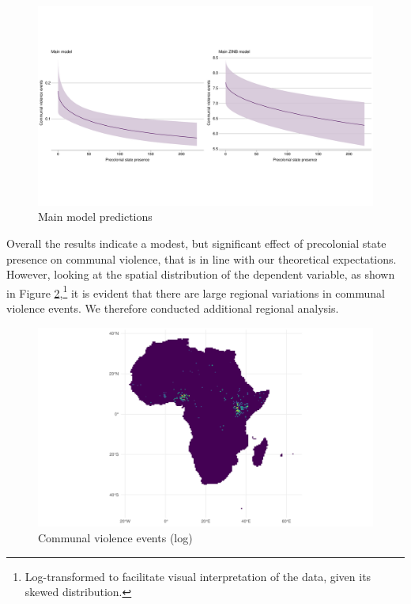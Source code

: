\begin{figure}[htpb]
	\centering
	\includegraphics[width=1\linewidth]{R/Output/mainplots.pdf}
	\caption{Main model predictions}
	\label{mainmodels}
\end{figure}

Overall the results indicate a modest, but significant effect of precolonial
state presence on communal violence, that is in line with our theoretical
expectations. However, looking at the spatial distribution of the dependent
variable, as shown in Figure \ref{logOrg3},\footnote{Log-transformed to
facilitate visual interpretation of the data, given its skewed distribution.}
it is evident that there are large regional variations in communal violence
events. We therefore conducted additional regional analysis.

\begin{figure}[htpb]
	\centering
	\includegraphics[width=1\linewidth]{R/Output/logOrg3.pdf}
	\caption{Communal violence events (log)}%
	\label{logOrg3}
\end{figure}

